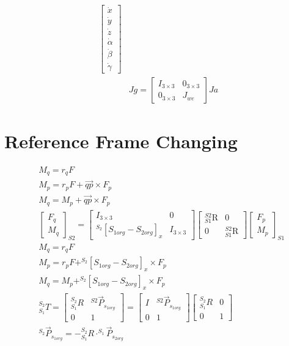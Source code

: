 \documentclass[12pt]{article}
\begin{document}
\begin{CJK}{UTF8}{bsmi}
\begin{equation*}
\begin{split}
\begin{bmatrix}
\dot{x} \\
\dot{y} \\
\dot{z} \\
\dot{\alpha} \\ 
\dot{\beta} \\ 
\dot{\gamma} 
\end{bmatrix}\\
&Jg = 							
\begin{bmatrix}
I_{3\times 3} & 0_{3\times 3}\\
0_{3\times 3} & J_{we}
\end{bmatrix}
Ja
\end{split}
\end{equation*}
\section{Reference Frame Changing}
\begin{equation*}
\begin{split}
&M_q = r_qF\\
&M_p = r_pF+\overrightarrow{qp}\times F_p\\
&M_q = M_p + \vec{qp} \times F_p\\
&\begin{bmatrix}
F_q\\ 
M_q
\end{bmatrix}
_{S2}
=
\begin{bmatrix}
I_{3 \times 3} & 0\\ 
^{S_2}[S_{1org}-S_{2org}]_x & I_{3 \times 3}
\end{bmatrix}
\begin{bmatrix}
_{S1}^{S2}\textrm{R} & 0\\ 
0 & _{S1}^{S2}\textrm{R}
\end{bmatrix}
\begin{bmatrix}
F_p\\ 
M_p
\end{bmatrix}
_{S1}\\
&M_q = r_qF\\
&M_p = r_pF+ ^{S_2}[S_{1org}-S_{2org}]_x\times F_p\\
&M_q = M_p + ^{S_2}[S_{1org}-S_{2org}]_x \times F_p\\
&^{S_2}_{S_1}T = 
\begin{bmatrix}
^{S_2}_{S_1}R   & ^{S2}\vec{P}_{s_{1 org} }\\ 
0               & 1
\end{bmatrix}
=
\begin{bmatrix}
I & ^{S2}\vec{P}_{s_{1 org} }\\ 
0 & 1
\end{bmatrix}
\begin{bmatrix}
^{S_2}_{S_1}R & 0\\ 
0 & 1
\end{bmatrix}\\
&^{S_2}\vec{P}_{s_{1 org} } = -^{S_2}_{S_1}R \cdot ^{S_1}\vec{P}_{s_{2 org}}\\
\end{split}
\end{equation*}

\end{CJK}
\end{document}
